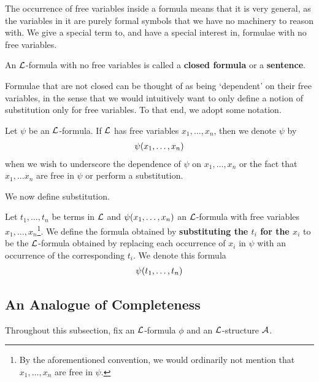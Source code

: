The occurrence of free variables inside a formula means that it is very general, as the variables in it are purely formal symbols that we have no machinery to reason with. We give a special term to, and have a special interest in, formulae with no free variables.

\begin{boxdefinition}
    An $\mathcal{L}$-formula with no free variables is called a \textbf{closed formula} or a \textbf{sentence}.
\end{boxdefinition}

Formulae that are not closed can be thought of as being `dependent' on their free variables, in the sense that we would intuitively want to only define a notion of substitution only for free variables. To that end, we adopt some notation.

\begin{boxconvention}
    Let $\psi$ be an $\mathcal{L}$-formula. If $\mathcal{L}$ has free variables $x_1, \ldots, x_n$, then we denote $\psi$ by 
    \begin{align*}
        \psi\!\left( x_1, \ldots, x_n \right)
    \end{align*}
    when we wish to underscore the dependence of $\psi$ on $x_1, \ldots, x_n$ or the fact that $x_1, \ldots x_n$ are free in $\psi$ or perform a substitution.
\end{boxconvention}

We now define substitution.

\begin{boxdefinition}[Substitution]
    Let $t_1, \ldots, t_n$ be terms in $\mathcal{L}$ and $\psi\!\left( x_1, \ldots, x_n \right)$ an $\mathcal{L}$-formula with free variables $x_1, \ldots, x_n$\footnote{By the aforementioned convention, we would ordinarily not mention that $x_1, \ldots, x_n$ are free in $\psi$.}. We define the formula obtained by \textbf{substituting the $t_i$ for the $x_i$} to be the $\mathcal{L}$-formula obtained by replacing each occurrence of $x_i$ in $\psi$ with an occurrence of the corresponding $t_i$. We denote this formula
    \begin{align*}
        \psi\!\left( t_1, \ldots, t_n \right)
    \end{align*}
\end{boxdefinition}

\subsection{An Analogue of Completeness}

Throughout this subsection, fix an $\mathcal{L}$-formula $\phi$ and an $\mathcal{L}$-structure $\mathcal{A}$.

